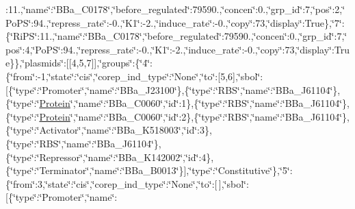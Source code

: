 \begin{DoxyCompactItemize}
{}\-:11.,\char`\"{}name\char`\"{}\-:\char`\"{}B\-Ba\-\_\-\-C0178\char`\"{},\char`\"{}before\-\_\-regulated\char`\"{}\-:79590.,\char`\"{}concen\char`\"{}\-:0.,\char`\"{}grp\-\_\-id\char`\"{}\-:7,\char`\"{}pos\char`\"{}\-:2,\char`\"{}Po\-P\-S\char`\"{}\-:94.,\char`\"{}repress\-\_\-rate\char`\"{}\-:-\/0.,\char`\"{}K1\char`\"{}\-:-\/2.,\char`\"{}induce\-\_\-rate\char`\"{}\-:-\/0.,\char`\"{}copy\char`\"{}\-:73,\char`\"{}display\char`\"{}\-:True\},\char`\"{}7\char`\"{}\-:\{\char`\"{}Ri\-P\-S\char`\"{}\-:11.,\char`\"{}name\char`\"{}\-:\char`\"{}B\-Ba\-\_\-\-C0178\char`\"{},\char`\"{}before\-\_\-regulated\char`\"{}\-:79590.,\char`\"{}concen\char`\"{}\-:0.,\char`\"{}grp\-\_\-id\char`\"{}\-:7,\char`\"{}pos\char`\"{}\-:4,\char`\"{}Po\-P\-S\char`\"{}\-:94.,\char`\"{}repress\-\_\-rate\char`\"{}\-:-\/0.,\char`\"{}K1\char`\"{}\-:-\/2.,\char`\"{}induce\-\_\-rate\char`\"{}\-:-\/0.,\char`\"{}copy\char`\"{}\-:73,\char`\"{}display\char`\"{}\-:True\}\},\char`\"{}plasmids\char`\"{}\-:\mbox{[}\mbox{[}4,5,7\mbox{]}\mbox{]},\char`\"{}groups\char`\"{}\-:\{\char`\"{}4\char`\"{}\-:\{\char`\"{}from\char`\"{}\-:-\/1,\char`\"{}state\char`\"{}\-:\char`\"{}cis\char`\"{},\char`\"{}corep\-\_\-ind\-\_\-type\char`\"{}\-:\char`\"{}None\char`\"{},\char`\"{}to\char`\"{}\-:\mbox{[}5,6\mbox{]},\char`\"{}sbol\char`\"{}\-:\mbox{[}\{\char`\"{}type\char`\"{}\-:\char`\"{}Promoter\char`\"{},\char`\"{}name\char`\"{}\-:\char`\"{}B\-Ba\-\_\-\-J23100\char`\"{}\},\{\char`\"{}type\char`\"{}\-:\char`\"{}R\-B\-S\char`\"{},\char`\"{}name\char`\"{}\-:\char`\"{}B\-Ba\-\_\-\-J61104\char`\"{}\},\{\char`\"{}type\char`\"{}\-:\char`\"{}\hyperlink{class_protein}{Protein}\char`\"{},\char`\"{}name\char`\"{}\-:\char`\"{}B\-Ba\-\_\-\-C0060\char`\"{},\char`\"{}id\char`\"{}\-:1\},\{\char`\"{}type\char`\"{}\-:\char`\"{}R\-B\-S\char`\"{},\char`\"{}name\char`\"{}\-:\char`\"{}B\-Ba\-\_\-\-J61104\char`\"{}\},\{\char`\"{}type\char`\"{}\-:\char`\"{}\hyperlink{class_protein}{Protein}\char`\"{},\char`\"{}name\char`\"{}\-:\char`\"{}B\-Ba\-\_\-\-C0060\char`\"{},\char`\"{}id\char`\"{}\-:2\},\{\char`\"{}type\char`\"{}\-:\char`\"{}R\-B\-S\char`\"{},\char`\"{}name\char`\"{}\-:\char`\"{}B\-Ba\-\_\-\-J61104\char`\"{}\},\{\char`\"{}type\char`\"{}\-:\char`\"{}Activator\char`\"{},\char`\"{}name\char`\"{}\-:\char`\"{}B\-Ba\-\_\-\-K518003\char`\"{},\char`\"{}id\char`\"{}\-:3\},\{\char`\"{}type\char`\"{}\-:\char`\"{}R\-B\-S\char`\"{},\char`\"{}name\char`\"{}\-:\char`\"{}B\-Ba\-\_\-\-J61104\char`\"{}\},\{\char`\"{}type\char`\"{}\-:\char`\"{}Repressor\char`\"{},\char`\"{}name\char`\"{}\-:\char`\"{}B\-Ba\-\_\-\-K142002\char`\"{},\char`\"{}id\char`\"{}\-:4\},\{\char`\"{}type\char`\"{}\-:\char`\"{}Terminator\char`\"{},\char`\"{}name\char`\"{}\-:\char`\"{}B\-Ba\-\_\-\-B0013\char`\"{}\}\mbox{]},\char`\"{}type\char`\"{}\-:\char`\"{}Constitutive\char`\"{}\},\char`\"{}5\char`\"{}\-:\{\char`\"{}from\char`\"{}\-:3,\char`\"{}state\char`\"{}\-:\char`\"{}cis\char`\"{},\char`\"{}corep\-\_\-ind\-\_\-type\char`\"{}\-:\char`\"{}None\char`\"{},\char`\"{}to\char`\"{}\-:\mbox{[}$\,$\mbox{]},\char`\"{}sbol\char`\"{}\-:\mbox{[}\{\char`\"{}type\char`\"{}\-:\char`\"{}Promoter\char`\"{},\char`\"{}name\char`\"{}\-:\
\end{DoxyCompactItemize}
